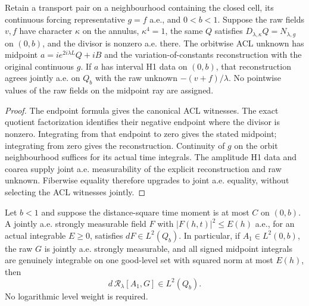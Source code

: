 \begin{lemma}
\label{lem:quarter-reconstruction-raw-ae}
\leanok
Retain a transport pair on a neighbourhood containing the closed cell,
its continuous forcing representative $g=f$ a.e., and $0<b<1$.
Suppose the raw fields $v,f$ have character $\kappa$ on the annulus,
$\kappa^4=1$, the same $Q$ satisfies $D_{\lambda,\kappa}Q=N_{\lambda,g}$
on $(0,b)$, and the divisor is nonzero a.e. there.
The orbitwise ACL unknown has midpoint $a=i e^{2i\lambda L}Q+iB$ and the
variation-of-constants reconstruction with the original continuous $g$.
If $a$ has interval H1 data on $(0,b)$, that reconstruction agrees
jointly a.e. on $Q_b$ with the raw unknown $-(v+f)/\lambda$.
No pointwise values of the raw fields on the midpoint ray are assigned.
\end{lemma}

\begin{proof}
\leanok
The endpoint formula gives the canonical ACL witnesses.
The exact quotient factorization identifies their negative endpoint where the
divisor is nonzero. Integrating from that endpoint to zero gives the stated
midpoint; integrating from zero gives the reconstruction.
Continuity of $g$ on the orbit neighbourhood suffices for its actual time integrals.
The amplitude H1 data and coarea supply joint a.e. measurability of the
explicit reconstruction and raw unknown. Fiberwise equality therefore
upgrades to joint a.e. equality, without selecting the ACL witnesses jointly.
\end{proof}

\begin{lemma}
\label{lem:quarter-weighted-level-bound}
\leanok
Let $b<1$ and suppose the distance-square time moment is at most $C$ on $(0,b)$.
A jointly a.e. strongly measurable field $F$ with
$|F(h,t)|^2\le E(h)$ a.e., for an actual integrable $E\ge0$, satisfies
$dF\in L^2(Q_b)$.
In particular, if $A_1\in L^2(0,b)$, the raw $G$ is jointly a.e. strongly
measurable, and all signed midpoint integrals are genuinely integrable on
one good-level set with squared norm at most $E(h)$, then
\[
 d\,\mathcal R_\lambda[A_1,G]\in L^2(Q_b).
\]
No logarithmic level weight is required.
\end{lemma}

